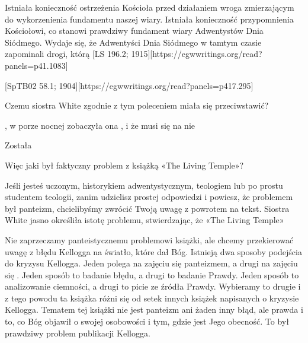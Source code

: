 Istniała konieczność ostrzeżenia Kościoła przed działaniem wroga zmierzającym do wykorzenienia fundamentu naszej wiary. Istniała konieczność przypomnienia Kościołowi, co stanowi prawdziwy fundament wiary Adwentystów Dnia Siódmego. Wydaje się, że Adwentyści Dnia Siódmego w tamtym czasie zapominali drogi, którą  [LS 196.2; 1915][https://egwwritings.org/read?panels=p41.1083]

[SpTB02 58.1; 1904][https://egwwritings.org/read?panels=p417.295]

Czemu siostra White zgodnie z tym poleceniem miała się przeciwstawić?

, w porze nocnej zobaczyła ona , i że musi się na nie  

Została 

Więc jaki był faktyczny problem z książką «The Living Temple»?

Jeśli jesteś uczonym, historykiem adwentystycznym, teologiem lub po prostu studentem teologii, zanim udzielisz prostej odpowiedzi i powiesz, że problemem był panteizm, chcielibyśmy zwrócić Twoją uwagę z powrotem na tekst. Siostra White jasno określiła istotę problemu, stwierdzając, że «The Living Temple» 

Nie zaprzeczamy panteistycznemu problemowi książki, ale chcemy przekierować uwagę z błędu Kellogga na światło, które dał Bóg. Istnieją dwa sposoby podejścia do kryzysu Kellogga. Jeden polega na zajęciu się panteizmem, a drugi na zajęciu się . Jeden sposób to badanie błędu, a drugi to badanie Prawdy. Jeden sposób to analizowanie ciemności, a drugi to picie ze źródła Prawdy. Wybieramy to drugie i z tego powodu ta książka różni się od setek innych książek napisanych o kryzysie Kellogga. Tematem tej książki nie jest panteizm ani żaden inny błąd, ale prawda i to, co Bóg objawił o swojej osobowości i tym, gdzie jest Jego obecność. To był prawdziwy problem publikacji Kellogga.


